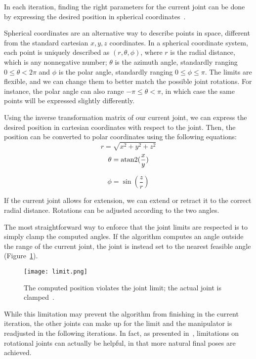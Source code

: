In each iteration, finding the right parameters for the current joint can be done by expressing the desired position in spherical coordinates~\cite{spherical}.

Spherical coordinates are an alternative way to describe points in space, different from the standard cartesian $x, y, z$ coordinates. In a spherical coordinate system, each point is uniquely described as $(r, \theta, \phi)$, where $r$ is the radial distance, which is any nonnegative number; $\theta$ is the azimuth angle, standardly ranging $0 \leq \theta < 2\pi$ and $\phi$ is the polar angle, standardly ranging $0 \leq \phi \leq \pi$. The limits are flexible, and we can change them to better match the possible joint rotations. For instance, the polar angle can also range $-\pi \le \theta < \pi$, in which case the same points will be expressed slightly differently.

Using the inverse transformation matrix of our current joint, we can express the desired position in cartesian coordinates with respect to the joint. Then, the position can be converted to polar coordinates using the following equations:
\begin{equation}
  r = \sqrt{x^2 + y^2 + z^2}
\end{equation}
\begin{equation}
  \theta = \operatorname{atan2}(\frac{x}{y})
\end{equation}

\begin{equation}
  \phi = \sin(\frac{z}{r})
\end{equation}

If the current joint allows for extension, we can extend or retract it to the correct radial distance. Rotations can be adjusted according to the two angles.

The most straightforward way to enforce that the joint limits are respected is to simply clamp the computed angles. If the algorithm computes an angle outside the range of the current joint,
the joint is instead set to the nearest feasible angle (Figure~\ref{fig:break}).

\begin{figure}[ht]
    \centering
    \texttt{[image: limit.png]}
    \caption{The computed position violates the joint limit; the actual joint is clamped~\cite{Ondika2021thesis}.}\label{fig:break}
\end{figure}

While this limitation may prevent the algorithm from finishing in the current iteration, the other joints can make up for the limit and the manipulator is readjusted in the following iterations. In fact, as presented in~\cite{fabrik}, limitations on rotational joints can actually be helpful, in that more natural final poses are achieved.

